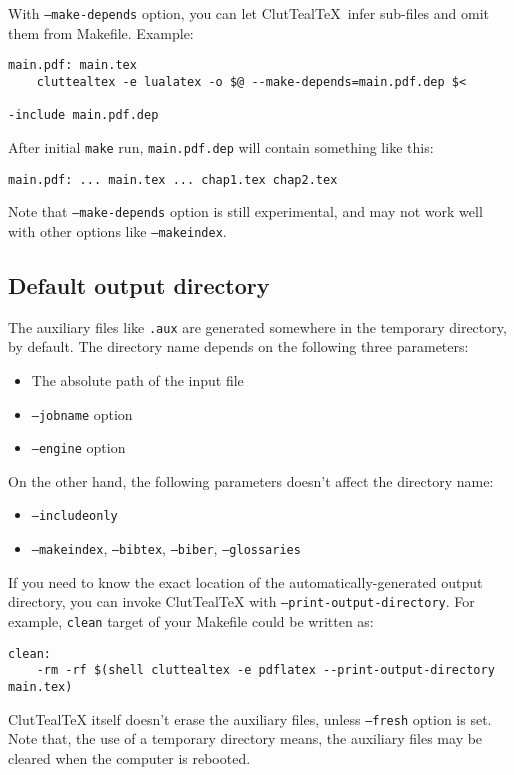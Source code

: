 \documentclass[a4paper, 11pt]{scrartcl}
\newcommand\CluttealTeX{ClutTeal\TeX\xspace}
\begin{document}
With \texttt{--make-depends} option, you can let \CluttealTeX\ infer sub-files and omit them from Makefile.
Example:

\begin{verbatim}
main.pdf: main.tex
    cluttealtex -e lualatex -o $@ --make-depends=main.pdf.dep $<

-include main.pdf.dep
\end{verbatim}

After initial \texttt{make} run, \texttt{main.pdf.dep} will contain something like this:
\begin{verbatim}
main.pdf: ... main.tex ... chap1.tex chap2.tex
\end{verbatim}

Note that \texttt{--make-depends} option is still experimental, and may not work well with other options like \texttt{--makeindex}.

\subsection{Default output directory}
The auxiliary files like \texttt{.aux} are generated somewhere in the temporary directory, by default.
The directory name depends on the following three parameters:
\begin{itemize}
\item The absolute path of the input file
\item \texttt{--jobname} option
\item \texttt{--engine} option
\end{itemize}
On the other hand, the following parameters doesn't affect the directory name:
\begin{itemize}
\item \texttt{--includeonly}
\item \texttt{--makeindex}, \texttt{--bibtex}, \texttt{--biber}, \texttt{--glossaries}
\end{itemize}

If you need to know the exact location of the automatically-generated output directory, you can invoke \CluttealTeX with \texttt{--print-output-directory}.
For example, \texttt{clean} target of your Makefile could be written as:
\begin{verbatim}
clean:
    -rm -rf $(shell cluttealtex -e pdflatex --print-output-directory main.tex)
\end{verbatim}

\CluttealTeX itself doesn't erase the auxiliary files, unless \texttt{--fresh} option is set.
Note that, the use of a temporary directory means, the auxiliary files may be cleared when the computer is rebooted.
\end{document}
